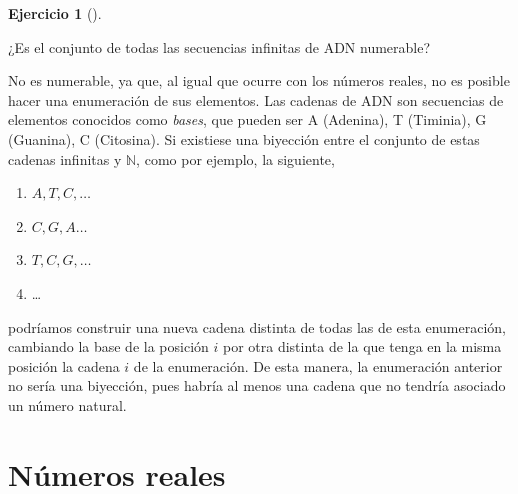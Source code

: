 \documentclass[
  spanish,
  a4paper,
]{scrreport}
\providecommand{\tightlist}{%
  \setlength{\itemsep}{0pt}\setlength{\parskip}{0pt}}
\theoremstyle{definition}
\newtheorem{exercise}{Ejercicio}[chapter]
\theoremstyle{remark}
\begin{document}
\begin{exercise}[]\protect\hypertarget{exr-conjunto-secuencias-adn-numerable}{}\label{exr-conjunto-secuencias-adn-numerable}

¿Es el conjunto de todas las secuencias infinitas de ADN numerable?

\end{exercise}

\begin{tcolorbox}[enhanced jigsaw, arc=.35mm, bottomrule=.15mm, bottomtitle=1mm, breakable, colback=white, colbacktitle=quarto-callout-tip-color!10!white, colframe=quarto-callout-tip-color-frame, coltitle=black, left=2mm, leftrule=.75mm, opacityback=0, opacitybacktitle=0.6, rightrule=.15mm, title=\textcolor{quarto-callout-tip-color}{\faLightbulb}\hspace{0.5em}{Solución}, titlerule=0mm, toprule=.15mm, toptitle=1mm]

No es numerable, ya que, al igual que ocurre con los números reales, no
es posible hacer una enumeración de sus elementos. Las cadenas de ADN
son secuencias de elementos conocidos como \emph{bases}, que pueden ser
A (Adenina), T (Timinia), G (Guanina), C (Citosina). Si existiese una
biyección entre el conjunto de estas cadenas infinitas y \(\mathbb{N}\),
como por ejemplo, la siguiente,

\begin{enumerate}
\def\labelenumi{\arabic{enumi}.}
\tightlist
\item
  \(A,T,C,\ldots\)
\item
  \(C,G,A\ldots\)
\item
  \(T,C,G,\ldots\)
\item
  \ldots
\end{enumerate}

podríamos construir una nueva cadena distinta de todas las de esta
enumeración, cambiando la base de la posición \(i\) por otra distinta de
la que tenga en la misma posición la cadena \(i\) de la enumeración. De
esta manera, la enumeración anterior no sería una biyección, pues habría
al menos una cadena que no tendría asociado un número natural.

\end{tcolorbox}


\chapter{Números reales}\label{nuxfameros-reales}
\end{document}

